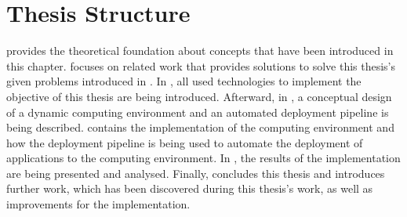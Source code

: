 \section{Thesis Structure}
 provides the theoretical foundation about concepts that have been introduced in this chapter.
 focuses on related work that provides solutions to solve this thesis's given problems introduced in .
In , all used technologies to implement the objective of this thesis are being introduced.
Afterward, in , a conceptual design of a dynamic computing environment and an automated deployment pipeline is being described.
 contains the implementation of the computing environment and how the deployment pipeline is being used to automate the deployment of applications to the computing environment.
In , the results of the implementation are being presented and analysed.
Finally,  concludes this thesis and introduces further work, which has been discovered during this thesis's work, as well as improvements for the implementation.
